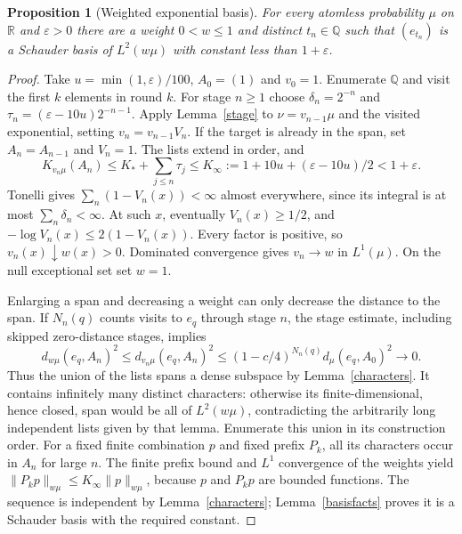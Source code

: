 \documentclass[reqno,a4paper,12pt]{amsart}
\newtheorem{proposition}[theorem]{Proposition}
\newcommand{\R}{\mathbb R}
\newcommand{\Q}{\mathbb Q}
\begin{document}
\begin{proposition}[Weighted exponential basis]\label{weighted}
For every atomless probability $\mu$ on $\R$ and $\varepsilon>0$ there
are a weight $0<w\le1$ and distinct $t_n\in\Q$ such that
$(e_{t_n})$ is a Schauder basis of $L^2(w\mu)$ with constant
less than $1+\varepsilon$.
\end{proposition}
\begin{proof}
Take $u=\min(1,\varepsilon)/100$, $A_0=(1)$ and $v_0=1$.
Enumerate $\Q$ and visit the first $k$ elements in round $k$.
For stage $n\ge1$ choose $\delta_n=2^{-n}$ and
$\tau_n=(\varepsilon-10u)2^{-n-1}$.
Apply Lemma~\ref{stage} to $\nu=v_{n-1}\mu$ and the visited exponential,
setting $v_n=v_{n-1}V_n$. If the target is already in the span, set
$A_n=A_{n-1}$ and $V_n=1$. The lists extend in order, and
\[
 K_{v_n\mu}(A_n)\le K_*+\sum_{j\le n}\tau_j
 \le K_\infty:=1+10u+(\varepsilon-10u)/2<1+\varepsilon.
\]
Tonelli gives $\sum_n(1-V_n(x))<\infty$ almost everywhere, since its
integral is at most $\sum_n\delta_n<\infty$.
At such $x$, eventually $V_n(x)\ge1/2$, and
$-\log V_n(x)\le2(1-V_n(x))$. Every factor is positive, so
$v_n(x)\downarrow w(x)>0$. Dominated convergence gives $v_n\to w$
in $L^1(\mu)$. On the null exceptional set set $w=1$.

Enlarging a span and decreasing a weight can only decrease the distance
to the span. If $N_n(q)$ counts visits to $e_q$ through stage $n$, the
stage estimate, including skipped zero-distance stages, implies
\[
 d_{w\mu}(e_q,A_n)^2\le d_{v_n\mu}(e_q,A_n)^2
 \le(1-c/4)^{N_n(q)}d_\mu(e_q,A_0)^2\longrightarrow0.
\]
Thus the union of the lists spans a dense subspace by
Lemma~\ref{characters}. It contains infinitely many distinct characters:
otherwise its finite-dimensional, hence closed, span would be all of
$L^2(w\mu)$, contradicting the arbitrarily long independent lists
given by that lemma. Enumerate this union in its construction order.
For a fixed finite combination $p$ and fixed prefix $P_k$, all its
characters occur in $A_n$ for large $n$. The finite prefix bound and
$L^1$ convergence of the weights yield
$\|P_kp\|_{w\mu}\le K_\infty\|p\|_{w\mu}$, because $p$ and $P_kp$
are bounded functions. The sequence is independent by
Lemma~\ref{characters}; Lemma~\ref{basisfacts} proves it is a Schauder
basis with the required constant.
\end{proof}
\end{document}
